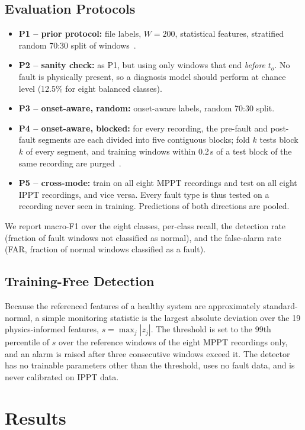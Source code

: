\documentclass[conference]{IEEEtran}
\begin{document}
\subsection{Evaluation Protocols}
\begin{itemize}
\item \textbf{P1 -- prior protocol:} file labels, $W=200$, statistical features, stratified random 70:30 split of windows~\cite{wali2021explainable}.
\item \textbf{P2 -- sanity check:} as P1, but using only windows that end \emph{before} $t_o$. No fault is physically present, so a diagnosis model should perform at chance level (12.5\% for eight balanced classes).
\item \textbf{P3 -- onset-aware, random:} onset-aware labels, random 70:30 split.
\item \textbf{P4 -- onset-aware, blocked:} for every recording, the pre-fault and post-fault segments are each divided into five contiguous blocks; fold $k$ tests block $k$ of every segment, and training windows within 0.2\,s of a test block of the same recording are purged~\cite{roberts2017cv,bergmeir2012cv}.
\item \textbf{P5 -- cross-mode:} train on all eight MPPT recordings and test on all eight IPPT recordings, and vice versa. Every fault type is thus tested on a recording never seen in training. Predictions of both directions are pooled.
\end{itemize}
We report macro-F1 over the eight classes, per-class recall, the detection rate (fraction of fault windows not classified as normal), and the false-alarm rate (FAR, fraction of normal windows classified as a fault).

\subsection{Training-Free Detection}
Because the referenced features of a healthy system are approximately standard-normal, a simple monitoring statistic is the largest absolute deviation over the 19 physics-informed features, $s=\max_j|z_j|$. The threshold is set to the 99th percentile of $s$ over the reference windows of the eight MPPT recordings only, and an alarm is raised after three consecutive windows exceed it. The detector has no trainable parameters other than the threshold, uses no fault data, and is never calibrated on IPPT data.

\section{Results}
\end{document}
